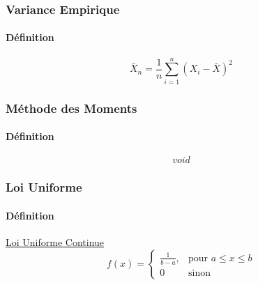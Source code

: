 \documentclass{article}
\begin{document}
\subsubsection{Variance Empirique}
\paragraph{Définition}
\begin{equation}
    \boxed{
        \bar{X}_{n} = \frac{1}{n} \sum^{n}_{i=1} (X_{i} - \bar{X})^{2}
    }
\end{equation}

\subsubsection{Méthode des Moments}
\paragraph{Définition}
\begin{equation}
    \boxed{
        void
    }
\end{equation}

\subsubsection{Loi Uniforme}
\paragraph{Définition} \href{https://fr.wikipedia.org/wiki/Loi_uniforme_continue}{Loi Uniforme Continue}
\begin{equation}
    \boxed{
        f(x) = 
        \begin{cases}
            \frac{1}{b-a},  & \text{pour } a \leq x \leq b\\
            0               & \text{sinon}    
        \end{cases}
    }
\end{equation}




\end{document}
